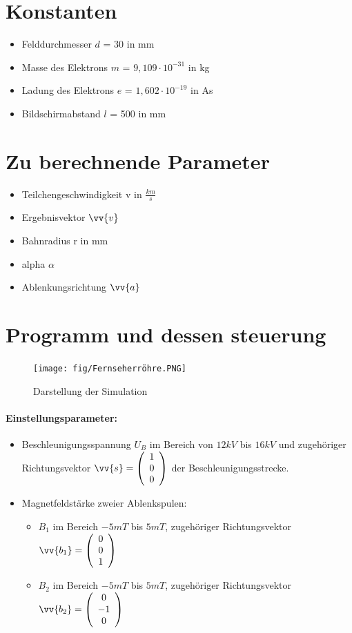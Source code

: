 \section{Konstanten}

\begin{itemize}
    \item Felddurchmesser $d$ = 30 in mm
    \item Masse des Elektrons $m$ =  $9,109 \cdot 10^{-31}$ in kg
    \item Ladung des Elektrons $e$ = $1,602 \cdot 10^{-19}$ in As
    \item Bildschirmabstand $l$ = 500 in mm
\end{itemize}

\section{Zu berechnende Parameter}

\begin{itemize}
    \item Teilchengeschwindigkeit v in $\frac{km}{s}$
    \item Ergebnisvektor $\vv{v}$
    \item Bahnradius r in mm 
    \item alpha $\alpha$
    \item Ablenkungsrichtung $\vv{a}$
\end{itemize}

\section{Programm und dessen steuerung}

\begin{figure}[h]
    \centering
    \texttt{[image: fig/Fernseherröhre.PNG]}
    \caption{Darstellung der Simulation}
    \label{fig:meineSimulation}
\end{figure}
\paragraph{Einstellungsparameter:}

\begin{itemize}
    \item Beschleunigungsspannung $U_B$ im Bereich von $12 kV$ bis $16 kV$ und  zugehöriger Richtungsvektor $\vv{s} = \vektor{1}{0}{0}$ der Beschleunigungsstrecke.
    \item Magnetfeldstärke zweier Ablenkspulen:
    
    \begin{itemize}
        \item $B_1$ im Bereich $-5 mT$ bis $5 mT$, zugehöriger Richtungsvektor $\vv{b_1} = \vektor{0}{0}{1}$ %
        \item $B_2$ im Bereich $-5 mT$ bis $5 mT$, zugehöriger Richtungsvektor $\vv{b_2} = \vektor{0}{-1}{0}$ %
    \end{itemize}

\end{itemize}

